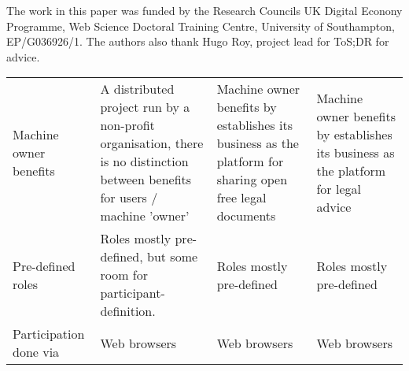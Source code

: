 \documentclass{sig-alternate}
\begin{document}
The work in this paper was funded by the Research Councils UK Digital Econony Programme, Web Science Doctoral Training Centre, University of Southampton, EP/G036926/1. The authors also thank Hugo Roy, project lead for ToS;DR for advice.

%

%
%
\appendix


\begin{table}[htp]
    \begin{tabular}{|p{3.5cm}|p{4cm}|p{4cm}|p{4cm}|}
    \hline
    Machine owner benefits            & A distributed project run by a non-profit organisation, there is no distinction between benefits for users / machine 'owner' & Machine owner benefits by establishes its business as the platform for sharing open free legal documents & Machine owner benefits by establishes its business as the platform for legal advice \\
    Pre-defined roles                 & Roles mostly pre-defined, but some room for participant-definition.                                                                                                      & Roles mostly pre-defined                                                                                 & Roles mostly pre-defined                                                            \\
    Participation done via            & Web browsers                                                                                                                                                             & Web browsers                                                                                             & Web browsers                                                                        \\

\end{tabular}
\end{table}
\end{document}
